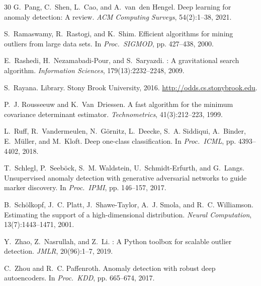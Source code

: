 \documentclass{article}
\begin{document}
\begin{thebibliography}{30}
G.~Pang, C.~Shen, L.~Cao, and A.~van~den Hengel.
\newblock Deep learning for anomaly detection: A review.
\newblock \emph{ACM Computing Surveys}, 54(2):1--38, 2021.

S.~Ramaswamy, R.~Rastogi, and K.~Shim.
\newblock Efficient algorithms for mining outliers from large data sets.
\newblock In \emph{Proc.\ SIGMOD}, pp. 427--438, 2000.

E.~Rashedi, H.~Nezamabadi-Pour, and S.~Saryazdi.
: A gravitational search algorithm.
\newblock \emph{Information Sciences}, 179(13):2232--2248, 2009.

S.~Rayana.
 Library.
\newblock Stony Brook University, 2016.
\newblock \url{http://odds.cs.stonybrook.edu}.

P.~J. Rousseeuw and K.~Van~Driessen.
\newblock A fast algorithm for the minimum covariance determinant estimator.
\newblock \emph{Technometrics}, 41(3):212--223, 1999.

L.~Ruff, R.~Vandermeulen, N.~G\"{o}rnitz, L.~Deecke, S.~A. Siddiqui, A.~Binder, E.~M\"{u}ller, and M.~Kloft.
\newblock Deep one-class classification.
\newblock In \emph{Proc.\ ICML}, pp. 4393--4402, 2018.

T.~Schlegl, P.~Seeb\"{o}ck, S.~M. Waldstein, U.~Schmidt-Erfurth, and G.~Langs.
\newblock Unsupervised anomaly detection with generative adversarial networks to guide marker discovery.
\newblock In \emph{Proc.\ IPMI}, pp. 146--157, 2017.

B.~Sch\"{o}lkopf, J.~C. Platt, J.~Shawe-Taylor, A.~J. Smola, and R.~C. Williamson.
\newblock Estimating the support of a high-dimensional distribution.
\newblock \emph{Neural Computation}, 13(7):1443--1471, 2001.

Y.~Zhao, Z.~Nasrullah, and Z.~Li.
: A {P}ython toolbox for scalable outlier detection.
\newblock \emph{JMLR}, 20(96):1--7, 2019.

C.~Zhou and R.~C. Paffenroth.
\newblock Anomaly detection with robust deep autoencoders.
\newblock In \emph{Proc.\ KDD}, pp. 665--674, 2017.

\end{thebibliography}
\end{document}
